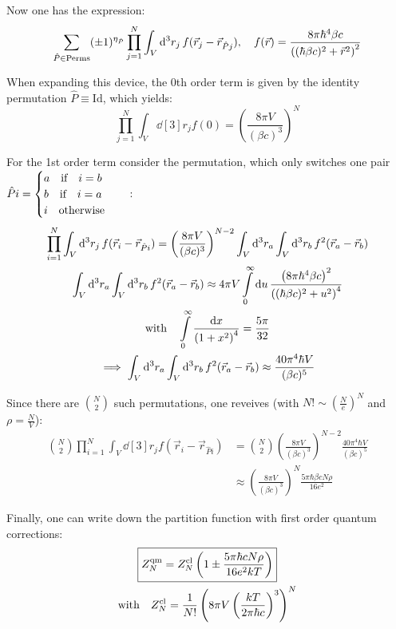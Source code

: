 \documentclass[11pt,a4paper]{scrartcl}
\begin{document}
Now one has the expression:
\begin{equation*}
    \sum_{\hat{P}\in\mathrm{Perms}}(\pm1)^{\eta_{\hat{P}}}\prod_{j=1}^{N}\int_V\dd[3]{r_j}
    f(\vec{r}_{j}-\vec{r}_{\hat{P}j})\qc
    f(\vec{r})=\frac{8\pi\hbar^4\beta c}{\left((\hbar\beta c)^2+\vec{r}^2\right)^2}
\end{equation*}

When expanding this device, the 0th order term is given by the identity
permutation $\hat{P}\equiv\mathrm{Id}$, which yields:
\begin{equation*}
    \prod_{j=1}^{N}\int_{V}\dd[3]{r_j}f(0)=\left(\frac{8\pi V}{(\beta
    c)^3}\right)^N
\end{equation*}

For the 1st order term consider the permutation, which only switches one pair
$\hat{P}i=
\begin{cases}
    a\qif i=b\\
    b\qif i=a\\
    i\qotherwise
\end{cases}
$:
\begin{gather*}
    \prod_{i=1}^{N}\int_{V}\dd[3]{r_j}f(\vec{r}_{i}-\vec{r}_{\hat{P}i})
    =\left(\frac{8\pi V}{(\beta
    c)^3}\right)^{N-2}\int_{V}\dd[3]{r_a}\int_{V}\dd[3]{r_b}f^2(\vec{r}_a-\vec{r}_b)
    \\
    \int_{V}\dd[3]{r_a}\int_{V}\dd[3]{r_b}f^2(\vec{r}_a-\vec{r}_b)\approx
    4\pi V\int\limits_{0}^{\infty}\dd{u}
    \frac{\left(8\pi\hbar^4\beta c\right)^2}{\left((\hbar\beta
    c)^2+u^2\right)^4} \\
    \qq*{with}
    \int\limits_{0}^{\infty}\frac{\dd{x}}{\left(1+x^2\right)^4}=\frac{5\pi}{32}\\
    \implies
    \int_{V}\dd[3]{r_a}\int_{V}\dd[3]{r_b}f^2(\vec{r}_a-\vec{r}_b)\approx
    \frac{40\pi^4\hbar V}{(\beta c)^5}
\end{gather*}

Since there are $\binom{N}{2}$ such permutations, one reveives (with
$N!\sim\left(\frac{N}{e}\right)^N$ and $\rho=\frac{N}{V}$):
\begin{align*}
    \binom{N}{2}\prod_{i=1}^{N}\int_{V}\dd[3]{r_j}f(\vec{r}_{i}-\vec{r}_{\hat{P}i})
    &=\binom{N}{2}\left(\frac{8\pi V}{(\beta
    c)^3}\right)^{N-2}\frac{40\pi^4\hbar V}{(\beta c)^5} \\
    &\approx\left(\frac{8\pi V}{(\beta c)^3}\right)^{N}\frac{5\pi\hbar\beta c
    N\rho}{16 e^2}
\end{align*}

Finally, one can write down the partition function with first order quantum
corrections:
\begin{gather*}
    \boxed{%
        Z_{N}^{\mathrm{qm}} = Z_{N}^{\mathrm{cl}}\left(1\pm\frac{5\pi\hbar c N\rho}{16e^2kT}\right)
    }\\
    \qq*{with} Z_{N}^{\mathrm{cl}}=\frac{1}{N!}\left(8\pi V\left(\frac{kT}{2\pi\hbar
    c}\right)^3\right)^N
\end{gather*}
\end{document}
